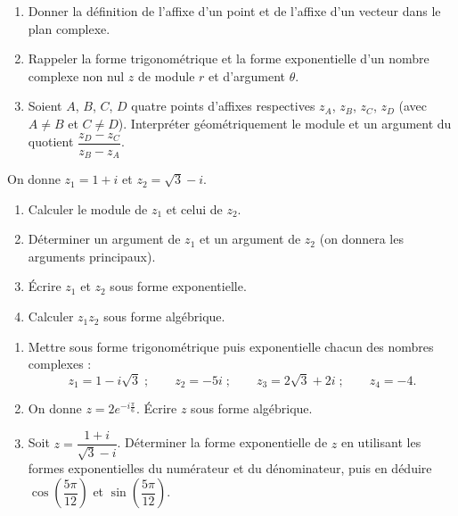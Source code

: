 \documentclass[11pt]{article}
\newcounter{popsec}
\newcounter{popsub}
\newcommand{\courssub}[1]{%
  \stepcounter{popsub}%
  \par\vspace{9pt}\noindent{\popxbold\fontsize{11.5}{13}\selectfont\color{popink}{\color{poporange}\thepopsec.\thepopsub}\hspace{6pt}#1}\par\nopagebreak\vspace{4pt}
}
\begin{document}
\begin{exercice}
\begin{enumerate}
\item Donner la définition de l'affixe d'un point et de l'affixe d'un vecteur dans le plan complexe.
\item Rappeler la forme trigonométrique et la forme exponentielle d'un nombre complexe non nul $z$ de module $r$ et d'argument $\theta$.
\item Soient $A$, $B$, $C$, $D$ quatre points d'affixes respectives $z_A$, $z_B$, $z_C$, $z_D$ (avec $A \neq B$ et $C \neq D$). Interpréter géométriquement le module et un argument du quotient $\dfrac{z_D - z_C}{z_B - z_A}$.
\end{enumerate}
\end{exercice}

\begin{exercice}
On donne $z_1 = 1 + i$ et $z_2 = \sqrt{3} - i$.
\begin{enumerate}
\item Calculer le module de $z_1$ et celui de $z_2$.
\item Déterminer un argument de $z_1$ et un argument de $z_2$ (on donnera les arguments principaux).
\item Écrire $z_1$ et $z_2$ sous forme exponentielle.
\item Calculer $z_1 z_2$ sous forme algébrique.
\end{enumerate}
\end{exercice}

\courssub{Je m'entraîne}

\begin{exercice}
\begin{enumerate}
\item Mettre sous forme trigonométrique puis exponentielle chacun des nombres complexes :
\[ z_1 = 1 - i\sqrt{3} \;; \qquad z_2 = -5i \;; \qquad z_3 = 2\sqrt{3} + 2i \;; \qquad z_4 = -4. \]
\item On donne $z = 2e^{-i\frac{\pi}{6}}$. Écrire $z$ sous forme algébrique.
\item Soit $z = \dfrac{1 + i}{\sqrt{3} - i}$. Déterminer la forme exponentielle de $z$ en utilisant les formes exponentielles du numérateur et du dénominateur, puis en déduire $\cos\left(\dfrac{5\pi}{12}\right)$ et $\sin\left(\dfrac{5\pi}{12}\right)$.
\end{enumerate}
\end{exercice}
\end{document}
